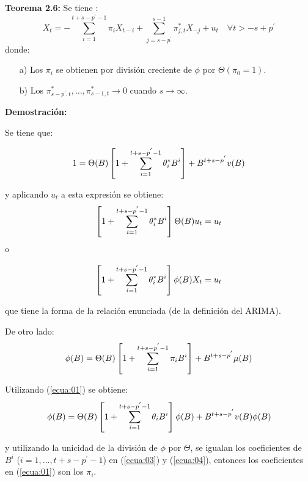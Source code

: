 \textbf{Teorema 2.6: }Se tiene :
\[
X_{t} =-\sum_{i=1}^{t+s-p^{'}-1} \pi_{i} X_{t-i} + \sum_{j=s-p^{'}}^{s-1} \pi_{j,t}^{\ast } X_{-j} +u_{t} \quad \forall t>-s+p^{'}
\]
donde:

\begin{enumerate}
\item[a)] Los $\pi_{i}$ se obtienen por divisi\'{o}n creciente de $\phi$ por $\Theta (\pi_{0} =1)$.
\item[b)] Los $\pi_{s-p^{'},t}^{\ast },\ldots, \pi_{s-1,t}^{\ast } \to 0$ cuando $s\to \infty$.
\end{enumerate}

\textbf{Demostraci\'{o}n:}\newline

Se tiene que:

\begin{equation}{
\label{ecua:01}
1=\Theta (B)\left[1+\sum_{i=1}^{t+s-p^{'}-1} \theta_{i}^{\ast} B^{i} \right]+B^{t+s-p^{'}} v(B) }
\end{equation}

y aplicando $u_{t}$ a esta expresi\'{o}n se obtiene:
\begin{equation}{
\label{ecua:02}
\left[1+\sum_{i=1}^{t+s-p^{'}-1} \theta_{i}^{\ast} B^{i} \right] \Theta (B)u_{t} =u_{t} }
\end{equation}
o

\begin{equation}{
\label{ecua:03}
\left[1+\sum_{i=1}^{t+s-p^{'}-1} \theta_{i}^{\ast} B^{i} \right]\phi (B)X_{t} =u_{t} }
\end{equation}

que tiene la forma de la relaci\'{o}n enunciada (de la definici\'{o}n del ARIMA).\newline

De otro lado:
\begin{equation}{
\label{ecua:04}
\phi(B)=\Theta (B)\left[1+\sum_{i=1}^{t+s-p^{'}-1}\pi_{i}B^{i} \right]+B^{t+s-p^{'}}\mu (B) }
\end{equation}

Utilizando (\ref{ecua:01}) se obtiene:
\begin{equation}{
\label{ecua:05}
\phi(B)=\Theta (B)\left[1+\sum_{i=1}^{t+s-p^{'}-1}\theta_{i}B^{i} \right]\phi (B)+B^{t+s-p^{'}}v(B)\phi(B) }
\end{equation}

y utilizando la unicidad de la divisi\'{o}n de $\phi$ por $\Theta$, se igualan los coeficientes de $B^{i}$ ($i=1,\ldots,t+s-p^{'}-1$) en (\ref{ecua:03}) y (\ref{ecua:04}), entonces los coeficientes en (\ref{ecua:01}) son los $\pi_{i}$.\newline

